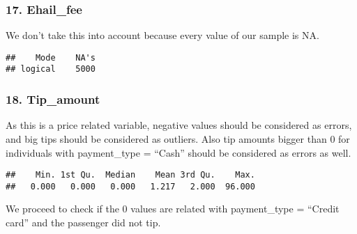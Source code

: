 \documentclass[
  18pt,
  a4paper]{article}
\newenvironment{Shaded}{\begin{snugshade}}{\end{snugshade}}
\newcommand{\DecValTok}[1]{\textcolor[rgb]{0.00,0.00,0.81}{#1}}
\newcommand{\KeywordTok}[1]{\textcolor[rgb]{0.13,0.29,0.53}{\textbf{#1}}}
\newcommand{\NormalTok}[1]{#1}
\newcommand{\OperatorTok}[1]{\textcolor[rgb]{0.81,0.36,0.00}{\textbf{#1}}}
\newcommand{\StringTok}[1]{\textcolor[rgb]{0.31,0.60,0.02}{#1}}
\begin{document}
\hypertarget{ehail_fee}{%
\subsubsection{17. Ehail\_fee}\label{ehail_fee}}

We don't take this into account because every value of our sample is NA.

\begin{Shaded}
\end{Shaded}

\begin{verbatim}
##    Mode    NA's 
## logical    5000
\end{verbatim}

\hypertarget{tip_amount}{%
\subsubsection{18. Tip\_amount}\label{tip_amount}}

As this is a price related variable, negative values should be
considered as errors, and big tips should be considered as outliers.
Also tip amounts bigger than 0 for individuals with payment\_type =
``Cash'' should be considered as errors as well.

\begin{Shaded}
\end{Shaded}

\begin{verbatim}
##    Min. 1st Qu.  Median    Mean 3rd Qu.    Max. 
##   0.000   0.000   0.000   1.217   2.000  96.000
\end{verbatim}

We proceed to check if the 0 values are related with payment\_type =
``Credit card'' and the passenger did not tip.

\begin{Shaded}
\end{Shaded}
\end{document}
